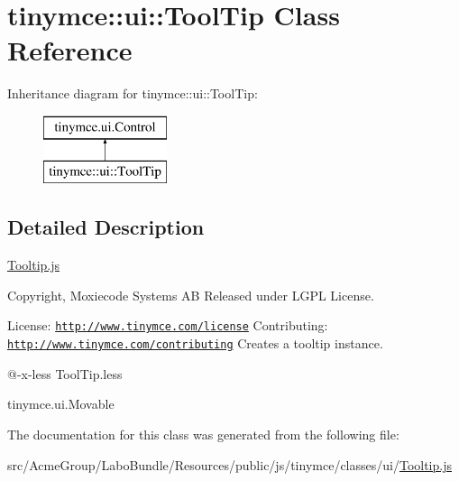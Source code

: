 \hypertarget{classtinymce_1_1ui_1_1_tool_tip}{\section{tinymce\+:\+:ui\+:\+:Tool\+Tip Class Reference}
\label{classtinymce_1_1ui_1_1_tool_tip}
}
Inheritance diagram for tinymce\+:\+:ui\+:\+:Tool\+Tip\+:\begin{figure}[H]
\begin{center}
\leavevmode
\includegraphics[height=2.000000cm]{classtinymce_1_1ui_1_1_tool_tip}
\end{center}
\end{figure}


\subsection{Detailed Description}
\hyperlink{_tooltip_8js}{Tooltip.\+js}

Copyright, Moxiecode Systems A\+B Released under L\+G\+P\+L License.

License\+: \href{http://www.tinymce.com/license}{\tt http\+://www.\+tinymce.\+com/license} Contributing\+: \href{http://www.tinymce.com/contributing}{\tt http\+://www.\+tinymce.\+com/contributing} Creates a tooltip instance.

@-\/x-\/less Tool\+Tip.\+less

tinymce.\+ui.\+Movable 

The documentation for this class was generated from the following file\+:\begin{DoxyCompactItemize}
\item 
src/\+Acme\+Group/\+Labo\+Bundle/\+Resources/public/js/tinymce/classes/ui/\hyperlink{_tooltip_8js}{Tooltip.\+js}\end{DoxyCompactItemize}

